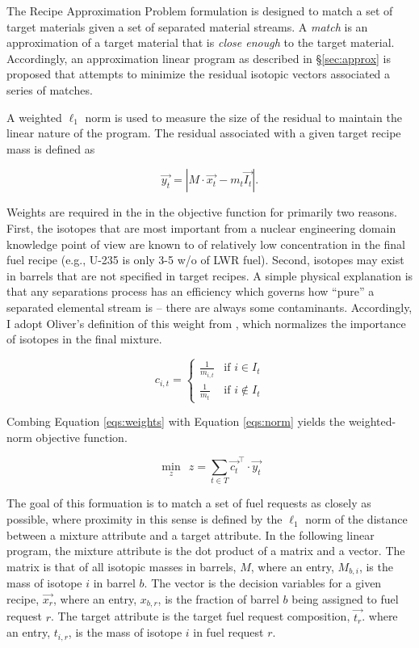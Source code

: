 The Recipe Approximation Problem formulation is designed to match a set of
target materials given a set of separated material streams. A \textit{match} is
an approximation of a target material that is \textit{close enough} to the
target material. Accordingly, an approximation linear program as described
in \S\ref{sec:approx} is proposed that attempts to minimize the residual
isotopic vectors associated a series of matches. 

A weighted $\ell_1$ norm is used to measure the size of the residual to maintain the
linear nature of the program. The residual associated with a given target recipe
mass is defined as

\begin{equation}\label{eqs:norm}
\vec{y_{t}} = \left| M \cdot \vec{x_{t}}  - m_t \vec{I_{t}} \right|.
\end{equation}

Weights are required in the in the objective function for primarily two
reasons. First, the isotopes that are most important from a nuclear engineering
domain knowledge point of view are known to of relatively low concentration in
the final fuel recipe (e.g., U-235 is only 3-5 w/o of LWR fuel). Second,
isotopes may exist in barrels that are not specified in target recipes. A simple
physical explanation is that any separations process has an efficiency which
governs how ``pure'' a separated elemental stream is -- there are always some
contaminants. Accordingly, I adopt Oliver's definition of this weight
from \cite{oliver_geniusv2:_2009}, which normalizes the importance of isotopes
in the final mixture.

\begin{equation}\label{eqs:weights}
c_{i,t} = 
\begin{cases}
 \frac{1}{m_{i,t}} & \text{if } i \in I_{t} \\
 \frac{1}{m_{t}}   & \text{if } i \not\in I_{t}
\end{cases}
\end{equation}

Combing Equation \ref{eqs:weights} with Equation \ref{eqs:norm} yields the
weighted-norm objective function.

\begin{equation}
\min_{z} \:\: z = \sum_{t \in T} \vec{c_{t}}^{\top} \cdot \vec{y_{t}}
\end{equation}




The goal of this formuation is to match a set of fuel requests as closely as
possible, where proximity in this sense is defined by the $\ell_1$ norm of the
distance between a mixture attribute and a target attribute. In the following
linear program, the mixture attribute is the dot product of a matrix and a
vector. The matrix is that of all isotopic masses in barrels, $M$, where an
entry, $M_{b,i}$, is the mass of isotope $i$ in barrel $b$. The vector is the
decision variables for a given recipe, $\vec{x_{r}}$, where an entry, $x_{b,r}$,
is the fraction of barrel $b$ being assigned to fuel request $r$. The target
attribute is the target fuel request composition, $\vec{t_{r}}$. where an entry,
$t_{i,r}$, is the mass of isotope $i$ in fuel request $r$.

